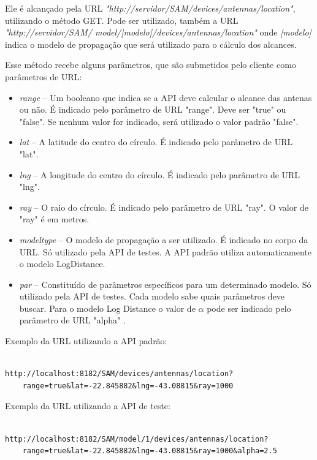 Ele é alcançado pela URL \textit{"http://servidor/SAM/devices/antennas/location"}, utilizando o método GET. Pode ser utilizado, também a URL \textit{"http://servidor/SAM/ model/[modelo]/devices/antennas/location"} onde \textit{[modelo]} indica o modelo de propagação que será utilizado para o cálculo dos alcances.

Esse método recebe alguns parâmetros, que são submetidos pelo cliente como parâmetros de URL:

\begin{itemize}
\item \textit{range} -- Um booleano que indica se a API deve calcular o alcance das antenas ou não. É indicado pelo parâmetro de URL "range". Deve ser "true" ou "false". Se nenhum valor for indicado, será utilizado o valor padrão "false".
\item \textit{lat} -- A latitude do centro do círculo. É indicado pelo parâmetro de URL "lat".
\item \textit{lng} -- A longitude do centro do círculo. É indicado pelo parâmetro de URL "lng".
\item \textit{ray} -- O raio do círculo. É indicado pelo parâmetro de URL "ray". O valor de "ray" é em metros.
\item \textit{modeltype} -- O modelo de propagação a ser utilizado. É indicado no corpo da URL. Só utilizado pela API de testes. A API padrão utiliza automaticamente o modelo LogDistance.
\item \textit{par} -- Constituído de parâmetros específicos para um determinado modelo. Só utilizado pela API de testes. Cada modelo sabe quais parâmetros deve buscar. Para o modelo Log Distance o valor de \begin{math} \alpha \end{math} pode ser indicado pelo parâmetro de URL "alpha" .
\end{itemize}


Exemplo da URL utilizando a API padrão:

\begin{lstlisting}	

http://localhost:8182/SAM/devices/antennas/location?
	range=true&lat=-22.845882&lng=-43.08815&ray=1000

\end{lstlisting}

Exemplo da URL utilizando a API de teste:

\begin{lstlisting}			

http://localhost:8182/SAM/model/1/devices/antennas/location?
	range=true&lat=-22.845882&lng=-43.08815&ray=1000&alpha=2.5

\end{lstlisting}


